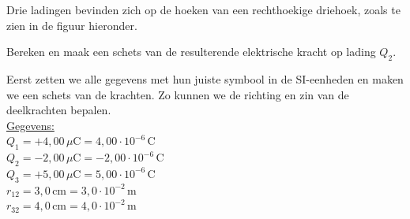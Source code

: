\documentclass{ximera}
\begin{document}
\begin{example}[foldable=true,title={Voorbeeld: loodrechte krachten in een driehoek}]\label{vb:rechthoek}\nl
    Drie ladingen bevinden zich op de hoeken van een rechthoekige driehoek, zoals te zien in de figuur hieronder.            
    
    \begin{center}
    \end{center}
    
    Bereken en maak een schets van de resulterende elektrische kracht op lading $Q_{2}$. 

    \begin{solution}\nl
        Eerst zetten we alle gegevens met hun juiste symbool in de SI-eenheden en maken we een schets van de krachten. Zo kunnen we de richting en zin van de deelkrachten bepalen.\\[1ex]
        
        \underline{Gegevens:}\\
        $Q_{1} = +4{,}00 \, \mu\mathrm{C} = 4{,}00 \cdot 10^{-6} \, \mathrm{C}$\\
        $Q_{2} = -2{,}00 \, \mu\mathrm{C} = -2{,}00 \cdot 10^{-6} \, \mathrm{C}$\\
        $Q_{3} = +5{,}00 \, \mu\mathrm{C} = 5{,}00 \cdot 10^{-6} \, \mathrm{C}$\\
        $r_{12} = 3{,}0 \, \mathrm{cm} = 3{,}0 \cdot 10^{-2} \, \mathrm{m}$\\
        $r_{32} = 4{,}0 \, \mathrm{cm} = 4{,}0 \cdot 10^{-2} \, \mathrm{m}$
        

\end{solution}
\end{example}
\end{document}
